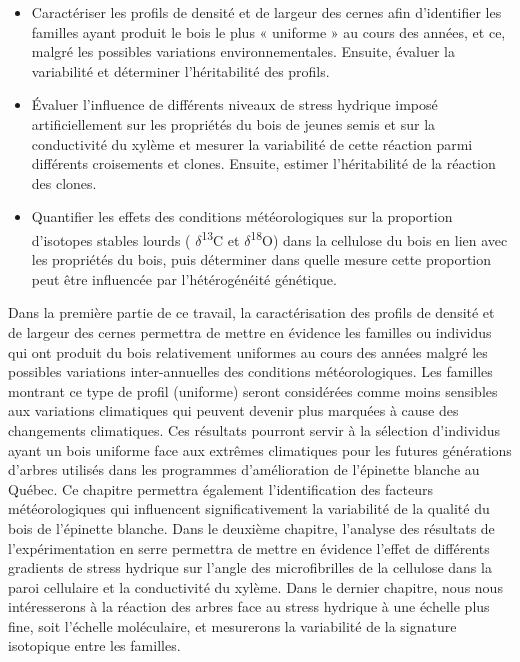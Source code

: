 \documentclass[a4paper,12pt]{report}
\newcommand{\Ctreize}{$\delta$\textsuperscript{13}C\xspace}
\newcommand{\Odixhuit}{$\delta$\textsuperscript{18}O\xspace}
\begin{document}
\begin{itemize} 
	
	\item Caractériser les profils de densité et de largeur des cernes afin d'identifier les familles ayant produit le bois le plus « uniforme » au cours des années, et ce, malgré les possibles variations environnementales. Ensuite, évaluer la variabilité et déterminer l'héritabilité des profils.
	
	\item Évaluer l'influence de différents niveaux de stress hydrique imposé artificiellement sur les propriétés du bois de jeunes semis et sur la conductivité du xylème et mesurer la variabilité de cette réaction parmi différents croisements et clones. Ensuite, estimer l'héritabilité de la réaction des clones.
	
	\item Quantifier les effets des conditions météorologiques sur la proportion d'isotopes stables lourds ( \Ctreize et \Odixhuit) dans la cellulose du bois en lien avec les propriétés du bois, puis déterminer dans quelle mesure cette proportion peut être influencée par l'hétérogénéité génétique.
	

	
\end{itemize}

   
Dans la première partie de ce travail, la caractérisation des profils de densité et de largeur des cernes permettra de mettre en évidence les familles ou individus qui ont produit du bois relativement \og uniformes \fg au cours des années malgré les possibles variations inter-annuelles des conditions météorologiques. Les familles montrant ce type de profil (uniforme) seront considérées comme moins sensibles aux variations climatiques qui peuvent devenir plus marquées à cause des changements climatiques. Ces résultats pourront servir à la sélection d'individus ayant un bois uniforme face aux extrêmes climatiques pour les futures générations d'arbres utilisés dans les programmes d'amélioration de l'épinette blanche au Québec. Ce chapitre permettra également l'identification des facteurs météorologiques qui influencent significativement la variabilité de la qualité du bois de l'épinette blanche. Dans le deuxième chapitre, l'analyse des résultats de l'expérimentation en serre permettra de mettre en évidence l'effet de différents gradients de stress hydrique sur l'angle des microfibrilles de la cellulose dans la paroi cellulaire et la conductivité du xylème. Dans le dernier chapitre, nous nous intéresserons à la réaction des arbres face au stress hydrique à une échelle plus fine, soit l'échelle moléculaire, et mesurerons la variabilité de la signature isotopique entre les familles. \\
\end{document}
